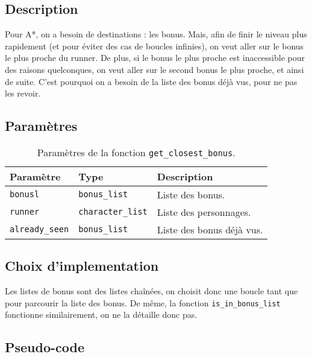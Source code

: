 \subsection{Description}

Pour A*, on a besoin de destinations : les bonus.
Mais, afin de finir le niveau plus rapidement (et pour éviter des cas de boucles infinies), on veut aller sur le bonus le plus proche du runner.
\newline
De plus, si le bonus le plus proche est inaccessible pour des raisons quelconques, on veut aller sur le second bonus le plus proche, et ainsi de suite.
C'est pourquoi on a besoin de la liste des bonus déjà vus, pour ne pas les revoir.

\subsection{Paramètres}

\begin{table}[!htpb]
    \begin{tabularx}{\textwidth}{lXX}
        \toprule
        \textbf{Paramètre} & \textbf{Type} & \textbf{Description} \\
        \midrule
        \texttt{bonusl} & \texttt{bonus\_list} & Liste des bonus. \\
        \texttt{runner} & \texttt{character\_list} & Liste des personnages. \\
        \texttt{already\_seen} & \texttt{bonus\_list} & Liste des bonus déjà vus. \\
        \bottomrule
    \end{tabularx}
    \caption{Paramètres de la fonction \texttt{get\_closest\_bonus}.}
    \label{tab:parameters-get_closest_bonus}
\end{table}

\subsection{Choix d'implementation}

Les listes de bonus sont des listes chaînées, on choisit donc une boucle tant que pour parcourir la liste des bonus.
De même, la fonction \texttt{is\_in\_bonus\_list} fonctionne similairement, on ne la détaille donc pas.

\newpage

\subsection{Pseudo-code}

